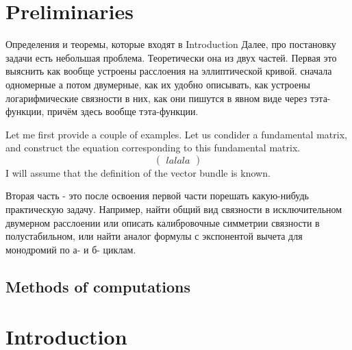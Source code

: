 \documentclass[../main.tex]{subfiles}
\begin{document}
    

    \section*{Preliminaries} \label{sec:prelim}
    Определения и теоремы, которые входят в Introduction
    Далее, про постановку задачи есть небольшая проблема.
    Теоретически она из двух частей.
    Первая это выяснить как вообще устроены расслоения на эллиптической кривой.
    сначала одномерные а потом двумерные, как их удобно описывать,
    как устроены логарифмические связности в них,
    как они пишутся в явном виде через тэта-функции,
    причём здесь вообще тэта-функции.

    Let me first provide a couple of examples. 
    Let us condider a fundamental matrix, and
    construct the equation corresponding
    to this fundamental matrix.
        \begin{equation}
                \begin{pmatrix}
               lalala         
                \end{pmatrix}
        \end{equation}
    I will assume that the definition of the vector bundle is known.

    Вторая часть - это после освоения первой части порешать какую-нибудь практическую задачу.
    Например, найти общий вид связности в исключительном двумерном расслоении
    или описать калибровочные симметрии связности в полустабильном,
    или найти аналог формулы с экспонентой вычета для монодромий по а- и б- циклам.


    \subsection*{Methods of computations}\label{subsec:методы-явных-вычислений}


    \section*{Introduction}\label{sec:introduction}
\end{document}
